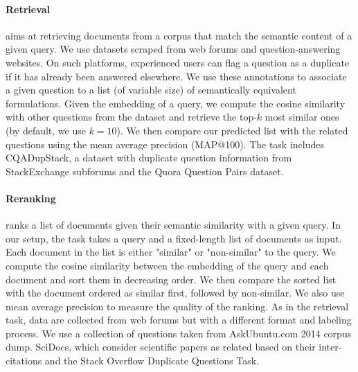 \paragraph{Retrieval} aims at retrieving documents from a corpus that match the semantic content of a given query. We use datasets scraped from web forums and question-answering websites. On such platforms, experienced users can flag a question as a duplicate if it has already been answered elsewhere. We use these annotations to associate a given question to a list (of variable size) of semantically equivalent formulations. Given the embedding of a query, we compute the cosine similarity with other questions from the dataset and retrieve the top-$k$ most similar ones (by default, we use $k=10$). We then compare our predicted list with the related questions using the mean average precision (MAP@100). The task includes CQADupStack, a dataset with duplicate question information from StackExchange subforums and the Quora Question Pairs dataset.

\paragraph{Reranking} ranks a list of documents given their semantic similarity with a given query. In our setup, the task takes a query and a fixed-length list of documents as input. Each document in the list is either "similar" or "non-similar" to the query. We compute the cosine similarity between the embedding of the query and each document and sort them in decreasing order. We then compare the sorted list with the document ordered as similar first, followed by non-similar. We also use mean average precision to measure the quality of the ranking. As in the retrieval task, data are collected from web forums but with a different format and labeling process. We use a collection of questions taken from AskUbuntu.com 2014 corpus dump. SciDocs, which consider scientific papers as related based on their inter-citations  and the Stack Overflow Duplicate Questions Task.

